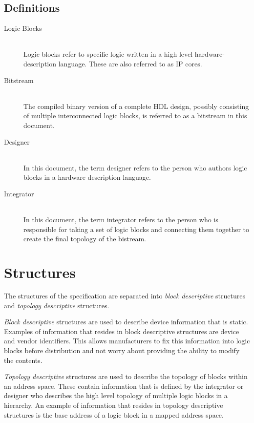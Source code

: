 \documentclass[a4paper, 12pt]{article}
\begin{document}
\subsection{Definitions}
\begin{description}
  \item[Logic Blocks] \hfill \\
    Logic blocks refer to specific logic written in a high level hardware-description
    language. These are also referred to as IP cores.
  \item[Bitstream] \hfill \\
    The compiled binary version of a complete HDL design, possibly consisting of
    multiple interconnected logic blocks, is referred to as a bitstream in this
    document.
  \item[Designer] \hfill \\
    In this document, the term designer refers to the person who authors logic
    blocks in a hardware description language.
  \item[Integrator] \hfill \\
    In this document, the term integrator refers to the person who is responsible
    for taking a set of logic blocks and connecting them together to create the
    final topology of the bistream.
\end{description}

\pagebreak

\section{Structures}

The structures of the specification are separated into \emph{block descriptive}
structures and \emph{topology descriptive} structures.

\emph{Block descriptive} structures are used to describe device information that
is static. Examples of information that resides in block descriptive
structures are device and vendor identifiers. This allows manufacturers to
fix this information into logic blocks before distribution and not worry
about providing the ability to modify the contents.

\emph{Topology descriptive} structures are used to describe the topology of blocks
within an address space. These contain information that is defined by the
integrator or designer who describes the high level topology of multiple
logic blocks in a hierarchy. An example of information that resides in
topology descriptive structures is the base address of a logic block in a
mapped address space.
\end{document}
